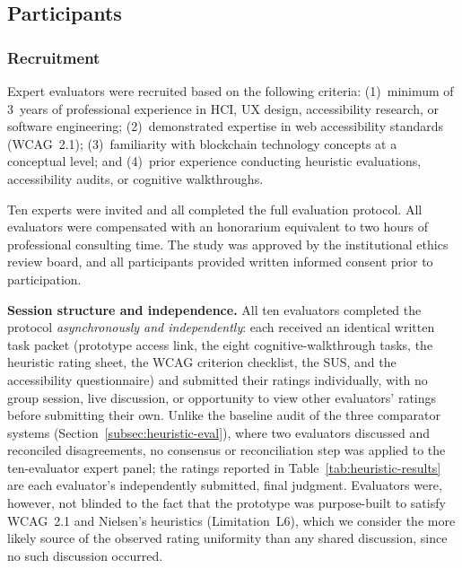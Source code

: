 \documentclass[journal,onecolumn]{IEEEtran}
\begin{document}
\subsection{Participants}
\label{subsec:participants}

\subsubsection{Recruitment}
\label{subsec:recruitment}

Expert evaluators were recruited based on the following criteria:
(1)~minimum of 3~years of professional experience in HCI, UX design,
accessibility research, or software engineering; (2)~demonstrated
expertise in web accessibility standards (WCAG~2.1); (3)~familiarity
with blockchain technology concepts at a conceptual level; and
(4)~prior experience conducting heuristic evaluations, accessibility
audits, or cognitive walkthroughs.

Ten experts were invited and all completed the full evaluation
protocol. All evaluators were compensated with an honorarium equivalent
to two hours of professional consulting time. The study was approved by
the institutional ethics review board, and all participants provided
written informed consent prior to participation.

\textbf{Session structure and independence.} All ten evaluators completed the protocol \emph{asynchronously and independently}: each received an identical written task packet (prototype access link, the eight cognitive-walkthrough tasks, the heuristic rating sheet, the WCAG criterion checklist, the SUS, and the accessibility questionnaire) and submitted their ratings individually, with no group session, live discussion, or opportunity to view other evaluators' ratings before submitting their own. Unlike the baseline audit of the three comparator systems (Section~\ref{subsec:heuristic-eval}), where two evaluators discussed and reconciled disagreements, no consensus or reconciliation step was applied to the ten-evaluator expert panel; the ratings reported in Table~\ref{tab:heuristic-results} are each evaluator's independently submitted, final judgment. Evaluators were, however, not blinded to the fact that the prototype was purpose-built to satisfy WCAG~2.1 and Nielsen's heuristics (Limitation~L6), which we consider the more likely source of the observed rating uniformity than any shared discussion, since no such discussion occurred.
\end{document}
